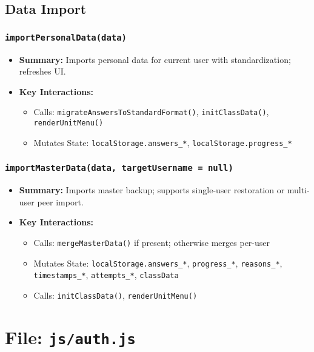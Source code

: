 \documentclass[11pt,letterpaper]{article}
\begin{document}
\subsection{Data Import}

\subsubsection{\texttt{importPersonalData(data)}}
\begin{itemize}
    \item \textbf{Summary:} Imports personal data for current user with standardization; refreshes UI.
    \item \textbf{Key Interactions:}
    \begin{itemize}
        \item Calls: \texttt{migrateAnswersToStandardFormat()}, \texttt{initClassData()}, \texttt{renderUnitMenu()}
        \item Mutates State: \texttt{localStorage.answers\_*}, \texttt{localStorage.progress\_*}
    \end{itemize}
\end{itemize}

\subsubsection{\texttt{importMasterData(data, targetUsername = null)}}
\begin{itemize}
    \item \textbf{Summary:} Imports master backup; supports single-user restoration or multi-user peer import.
    \item \textbf{Key Interactions:}
    \begin{itemize}
        \item Calls: \texttt{mergeMasterData()} if present; otherwise merges per-user
        \item Mutates State: \texttt{localStorage.answers\_*}, \texttt{progress\_*}, \texttt{reasons\_*}, \texttt{timestamps\_*}, \texttt{attempts\_*}, \texttt{classData}
        \item Calls: \texttt{initClassData()}, \texttt{renderUnitMenu()}
    \end{itemize}
\end{itemize}

\section{File: \texttt{js/auth.js}}
\end{document}
